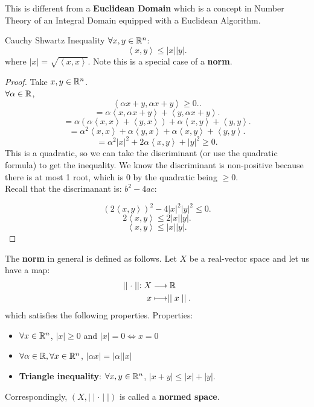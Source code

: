 \documentclass[a4paper]{article}
\begin{document}
\begin{remark}
  This is different from a \textbf{Euclidean Domain} which is a concept in Number Theory of an Integral Domain equipped with a Euclidean Algorithm.
\end{remark}

\begin{definition}{Cauchy Shwartz Inequality}
  $\forall x,y \in \mathbb{R}^n$:
  \[
  \left< x,y  \right> \leq |x| |y|
  .\] 
  where $|x| = \sqrt{\left< x,x \right>}$. Note this is a special case of a \textbf{norm}.
\end{definition}

\begin{proof}
  Take $x,y \in \mathbb{R}^n$. \\

  $\forall \alpha \in \mathbb{R}$,
  \[
  \left< \alpha x + y, \alpha x + y \right> \geq 0.
  .\] 
  \[
  = \alpha \left< x , \alpha x + y \right> + \left< y, \alpha x + y \right>
  .\]
  \[
  = \alpha (\alpha \left< x, x \right> + \left< y, x \right>) + \alpha \left<x , y \right> + \left< y, y \right> 
  .\]
  \[
   = \alpha^2 \left< x, x \right> + \alpha \left< y, x \right> + \alpha \left<x , y \right> + \left< y, y \right> 
  .\] 
  \[
  = \alpha^2 |x|^2 + 2 \alpha \left< x, y \right> + |y|^2 \geq 0
  .\]
  This is a quadratic, so we can take the discriminant (or use the quadratic formula) to get the inequality. We know the
  discriminant is non-positive because there is at most 1 root, which is 0 by the quadratic being $\geq 0$. \\
  Recall that the discrimanant is: $b^2 - 4ac$:

  \[
    (2 \left< x,y \right>)^2- 4 |x|^2 |y|^2 \leq 0
  .\] 
  \[
  2 \left< x,y \right> \leq 2 |x| |y|
  .\] 
  \[
  \left< x,y \right> \leq |x| |y|
  .\] 
\end{proof}

\begin{definition}
  The \textbf{norm} in general is defined as follows. Let $X$ be a real-vector space and let us have a map:
  \begin{align*}
       \mid \mid  \cdot  \mid \mid  : X &\longrightarrow \mathbb{R} \\
    x &\longmapsto  \mid \mid  x  \mid \mid  
  .\end{align*}
  which satisfies the following properties. Properties: 
  \begin{itemize}
    \item $\forall x \in \mathbb{R}^n$, $|x| \geq 0$ and  $|x| = 0 \iff x = 0$
    \item $\forall \alpha \in \mathbb{R}, \forall x \in \mathbb{R}^n$, $|\alpha x|= |\alpha| |x|$
    \item \textbf{Triangle inequality}:  $\forall x,y \in \mathbb{R}^n$, $|x + y| \leq |x| + |y|$. 
  \end{itemize}

  Correspondingly, $\left( X,  \mid  \mid \cdot  \mid  \mid  \right)$ is called a \textbf{normed space}.
\end{definition}
\end{document}
